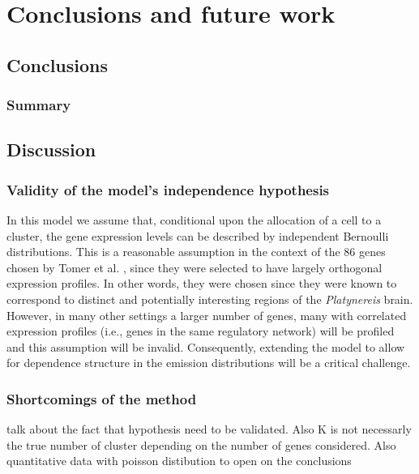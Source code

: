 \chapter{Conclusions and future work}\label{ch:conclusions}

\section{Conclusions}

	\subsection{Summary}
	

	\section{Discussion}
		\subsection{Validity of the model's independence hypothesis}
		In this model we assume that, conditional upon the allocation of a cell to a cluster, the gene expression levels can be described by independent Bernoulli distributions. This is a reasonable assumption in the context of the 86 genes chosen by Tomer et al. \cite{Tomer10}, since they were selected to have largely orthogonal expression profiles. In other words, they were chosen since they were known to correspond to distinct and potentially interesting regions of the {\it{Platynereis}} brain. However, in many other settings a larger number of genes, many with correlated expression profiles (i.e., genes in the same regulatory network) will be profiled and this assumption will be invalid. Consequently, extending the model to allow for dependence structure in the emission distributions will be a critical challenge.
		\subsection{Shortcomings of the method}
		talk about the fact that hypothesis need to be validated. Also K is not necessarly the true number of cluster depending on the number of genes considered. Also quantitative data with poisson distibution to open on the conclusions
	



